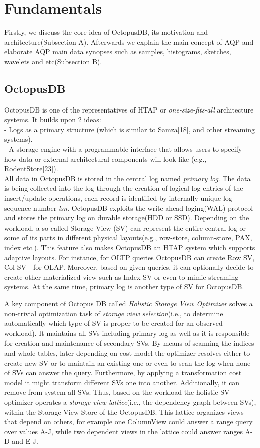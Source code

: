 \documentclass[10pt, conference, compsocconf]{IEEEtran}
\begin{document}
\section{Fundamentals}
Firstly, we discuss the core idea of OctopusDB, its motivation and  architecture(Subsection A). Afterwards we explain the main concept of AQP and elaborate AQP main data synopses such as samples, histograms, sketches, wavelets and etc(Subsection B).
\subsection{OctopusDB}
OctopusDB is one of the representatives of HTAP or \textit{one-size-fits-all} architecture systems. 
It builds upon 2 ideas:\\
- Logs as a primary structure (which is similar to Samza[18], and other streaming systems).\\
- A storage engine with a programmable interface that allows users to specify how data or external architectural components will look like (e.g., RodentStore[23]).\\
All data in OctopusDB is stored in the central log named \textit{primary log}. The data is being collected into the log through the creation of logical log-entries of the insert/update operations, each record is identified by internally unique log sequence number \textit{lsn}. OctopusDB exploits the write-ahead loging(WAL) protocol and stores the primary log on durable storage(HDD or SSD). Depending on the workload, a so-called Storage View (SV) can represent the entire central log or some of its parts in different physical layouts(e.g., row-store, column-store, PAX, index etc.). This feature also makes OctopusDB  an HTAP system which supports adaptive layouts.
For instance, for OLTP queries OctopusDB can create Row SV, Col SV - for OLAP. Moreover, based on given queries, it can optionally decide to create other materialized view such as Index SV or even to mimic streaming systems. At the same time, primary log is another type of SV for OctopusDB.  

A key component of Octopus DB called \textit{Holistic Storage View Optimizer} solves a non-trivial optimization task of \textit{storage view selection}(i.e., to determine automatically which type of SV is proper to be created for an observed workload). It maintains all SVs including primary log as well as it is responsible for creation and maintenance of secondary SVs. By means of scanning the indices and whole tables, later  depending on cost model the optimizer resolves either to create new SV or to maintain an existing one or even to scan the log when none of SVs can answer the query. Furthermore, by applying a transformation cost model it might transform different SVs one into another. Additionally, it can remove from system all SVs. Thus, based on the workload the holistic SV optimizer operates a \textit{storage view lattice}(i.e., the dependency graph between SVs), within the Storage View Store of the OctopusDB. This lattice organizes views that depend on others, for example one ColumnView could answer a range query over values A-J, while two dependent views in the lattice could answer ranges A-D and E-J.
\end{document}
